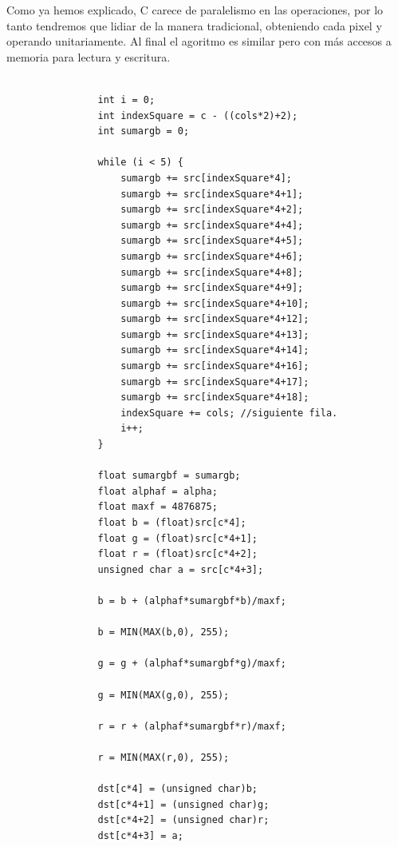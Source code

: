Como ya hemos explicado, C carece de paralelismo en las operaciones, por lo tanto tendremos que lidiar de la manera tradicional, obteniendo cada pixel y operando unitariamente. Al final el agoritmo es similar pero con más accesos a memoria para lectura y escritura.

\begin{codesnippet}
\begin{verbatim}
                
                int i = 0;
                int indexSquare = c - ((cols*2)+2);
                int sumargb = 0;
                
                while (i < 5) {
                    sumargb += src[indexSquare*4];
                    sumargb += src[indexSquare*4+1];
                    sumargb += src[indexSquare*4+2];
                    sumargb += src[indexSquare*4+4];
                    sumargb += src[indexSquare*4+5];
                    sumargb += src[indexSquare*4+6];
                    sumargb += src[indexSquare*4+8];
                    sumargb += src[indexSquare*4+9];
                    sumargb += src[indexSquare*4+10];
                    sumargb += src[indexSquare*4+12];
                    sumargb += src[indexSquare*4+13];
                    sumargb += src[indexSquare*4+14];
                    sumargb += src[indexSquare*4+16];
                    sumargb += src[indexSquare*4+17];
                    sumargb += src[indexSquare*4+18];
                    indexSquare += cols; //siguiente fila.
                    i++;
                }

                float sumargbf = sumargb;
                float alphaf = alpha;
                float maxf = 4876875;
                float b = (float)src[c*4];
                float g = (float)src[c*4+1];
                float r = (float)src[c*4+2];
                unsigned char a = src[c*4+3];

                b = b + (alphaf*sumargbf*b)/maxf;

                b = MIN(MAX(b,0), 255);

                g = g + (alphaf*sumargbf*g)/maxf;

                g = MIN(MAX(g,0), 255);

                r = r + (alphaf*sumargbf*r)/maxf;

                r = MIN(MAX(r,0), 255);

                dst[c*4] = (unsigned char)b;
                dst[c*4+1] = (unsigned char)g;
                dst[c*4+2] = (unsigned char)r;
                dst[c*4+3] = a;
                
\end{verbatim}
\end{codesnippet}

